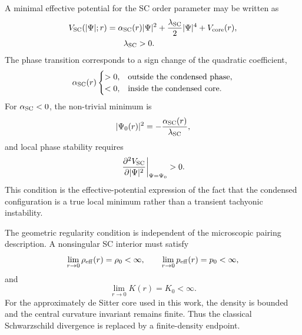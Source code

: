 \documentclass[epj]{svjour}
\begin{document}
A minimal effective potential for the SC order parameter may be written as
\begin{equation}
\begin{aligned}
V_{\rm SC}(|\Psi|;r)
&=
\alpha_{\rm SC}(r)|\Psi|^2
+
\frac{\lambda_{\rm SC}}{2}|\Psi|^4
+
V_{\rm core}(r),\\
&\hspace{2em}\lambda_{\rm SC}>0 .
\end{aligned}
\label{eq:SC_effective_potential}
\end{equation}
The phase transition corresponds to a sign change of the quadratic coefficient,
\begin{equation}
\alpha_{\rm SC}(r)
\begin{cases}
>0, & \text{outside the condensed phase},\\
<0, & \text{inside the condensed core}.
\end{cases}
\label{eq:SC_alpha_sign}
\end{equation}
For $\alpha_{\rm SC}<0$, the non-trivial minimum is
\begin{equation}
|\Psi_0(r)|^2
=
-\frac{\alpha_{\rm SC}(r)}{\lambda_{\rm SC}},
\label{eq:SC_condensate_minimum}
\end{equation}
and local phase stability requires
\begin{equation}
\left.
\frac{\partial^2 V_{\rm SC}}{\partial |\Psi|^2}
\right|_{\Psi=\Psi_0}
> 0 .
\label{eq:SC_potential_stability}
\end{equation}
This condition is the effective-potential expression of the fact that the
condensed configuration is a true local minimum rather than a transient
tachyonic instability.

The geometric regularity condition is independent of the microscopic pairing
description. A nonsingular SC interior must satisfy
\begin{equation}
\lim_{r\rightarrow 0}\rho_{\rm eff}(r)=\rho_0<\infty,
\qquad
\lim_{r\rightarrow 0}p_{\rm eff}(r)=p_0<\infty,
\label{eq:SC_finite_stress_energy}
\end{equation}
and
\begin{equation}
\lim_{r\rightarrow 0}K(r)=K_0<\infty .
\label{eq:SC_finite_kretschmann}
\end{equation}
For the approximately de Sitter core used in this work, the density is bounded
and the central curvature invariant remains finite. Thus the classical
Schwarzschild divergence is replaced by a finite-density endpoint.
\end{document}
